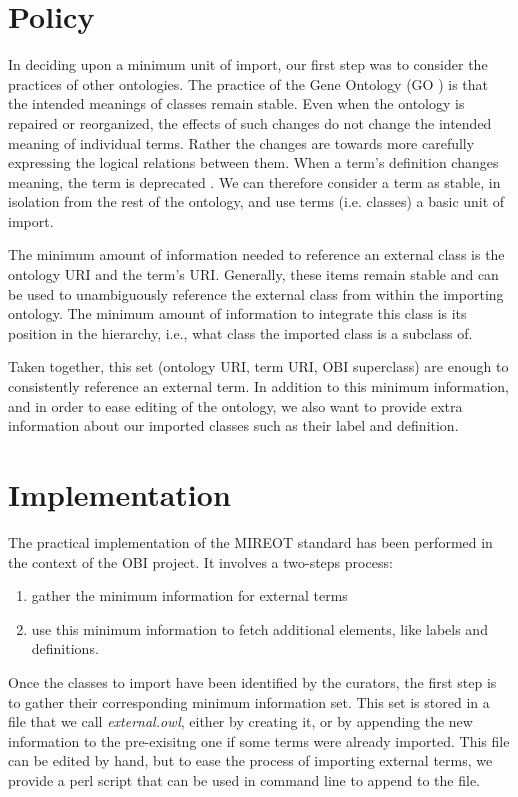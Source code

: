 \documentclass{elsart3p}    %
\begin{document}
\section*{Policy}

In deciding upon a minimum unit of import, our first step was to consider the practices of other ontologies.
The practice of the Gene Ontology (GO \cite{RefWorks:79}) is that the intended meanings of classes remain stable.
Even when the ontology is repaired or reorganized, the effects of such changes do not change the intended meaning of individual terms. 
Rather the changes are towards more carefully expressing the logical relations between them.
When a term's definition changes meaning, the term is deprecated \cite{RefWorks:1560}.
We can therefore consider a term as stable, in isolation from the rest of the ontology, and use terms (i.e. classes) a basic unit of import. 

The minimum amount of information needed to reference an external class is the ontology URI and the term's URI.
Generally, these items remain stable and can be used to unambiguously reference the external class from within the importing ontology.
The minimum amount of information to integrate this class is its position in the hierarchy, i.e., what class the imported class is a subclass of.

Taken together, this set (ontology URI, term URI, OBI superclass) are enough to consistently reference an external term.
In addition to this minimum information, and in order to ease editing of the ontology, we also want to provide extra information about our imported classes such as their label and definition. 




\section*{Implementation}

The practical implementation of the MIREOT standard has been performed in the context of the OBI project.
It involves a two-steps process:

\begin{enumerate}
\item gather the minimum information for external terms
\item use this minimum information to fetch additional elements, like labels and definitions.
\end{enumerate}


Once the classes to import have been identified by the curators, the first step is to gather their corresponding minimum information set.
This set is stored in a file that we call \emph{external.owl}, either by creating it, or by appending the new information to the pre-exisitng one if some terms were already imported.
This file can be edited by hand, but to ease the process of importing external terms, we provide a perl script that can be used in command line to append to the file.
\end{document}
